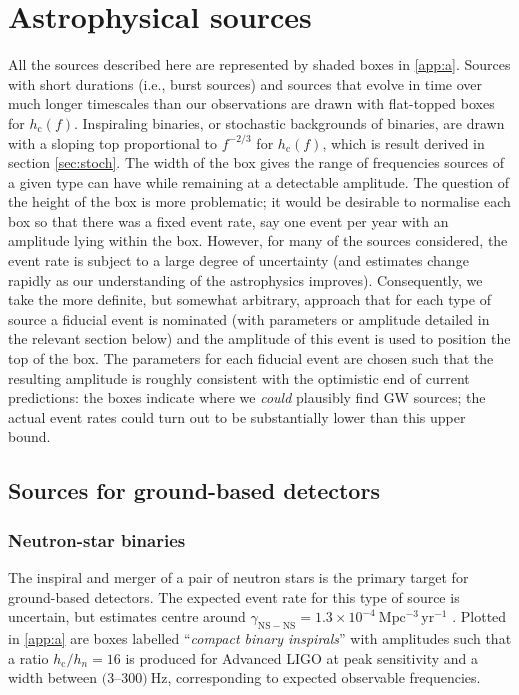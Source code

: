 \section{Astrophysical sources}\label{sec:sources}

All the sources described here are represented by shaded boxes in \ref{app:a}. Sources with short durations (i.e., burst sources) and sources that evolve in time over much longer timescales than our observations are drawn with flat-topped boxes for $h_\mathrm{c}(f)$. Inspiraling binaries, or stochastic backgrounds of binaries, are drawn with a sloping top proportional to $f^{-2/3}$ for $h_\mathrm{c}(f)$, which is result derived in section \ref{sec:stoch}. The width of the box gives the range of frequencies sources of a given type can have while remaining at a detectable amplitude. The question of the height of the box is more problematic; it would be desirable to normalise each box so that there was a fixed event rate, say one event per year with an amplitude lying within the box. However, for many of the sources considered, the event rate is subject to a large degree of uncertainty (and estimates change rapidly as our understanding of the astrophysics improves). Consequently, we take the more definite, but somewhat arbitrary, approach that for each type of source a fiducial event is nominated (with parameters or amplitude detailed in the relevant section below) and the amplitude of this event is used to position the top of the box. The parameters for each fiducial event are chosen such that the resulting amplitude is roughly consistent with the optimistic end of current predictions: the boxes indicate where we \emph{could} plausibly find GW sources; the actual event rates could turn out to be substantially lower than this upper bound. 

\subsection{Sources for ground-based detectors}

\subsubsection{Neutron-star binaries}

The inspiral and merger of a pair of neutron stars is the primary target for ground-based detectors. The expected event rate for this type of source is uncertain, but estimates centre around $\gamma_{\mathrm{NS-NS}}=1.3\times 10^{-4}~\mathrm{Mpc^{-3}\,yr^{-1}}$ \citep{CBC}. Plotted in \ref{app:a} are boxes labelled ``\emph{compact binary inspirals}'' with amplitudes such that a ratio $h_\mathrm{c}/h_{n}=16$ is produced for Advanced LIGO at peak sensitivity and a width between $(3$--$300)~\mathrm{Hz}$, corresponding to expected observable frequencies.

